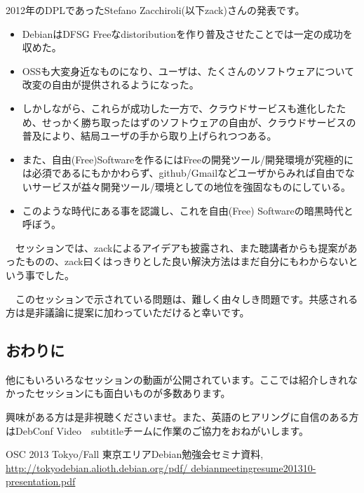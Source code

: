\documentclass[mingoth,a4paper]{jsarticle}
\begin{document}
 2012年のDPLであったStefano Zacchiroli(以下zack)さんの発表です。

 \begin{itemize}
  \item DebianはDFSG Freeなdistoributionを作り普及させたことでは一定の成功を収めた。
　\item OSSも大変身近なものになり、ユーザは、たくさんのソフトウェアについて改変の自由が提供されるようになった。
  \item しかしながら、これらが成功した一方で、クラウドサービスも進化したため、せっかく勝ち取ったはずのソフトウェアの自由が、クラウドサービスの普及により、結局ユーザの手から取り上げられつつある。
 \item また、自由(Free)Softwareを作るにはFreeの開発ツール/開発環境が究極的には必須であるにもかかわらず、github/Gmailなどユーザからみれば自由でないサービスが益々開発ツール/環境としての地位を強固なものにしている。
 \end{itemize}

 \begin{itemize}
 \item このような時代にある事を認識し、これを自由(Free) Softwareの暗黒時代と呼ぼう。
\end{itemize}

　セッションでは、zackによるアイデアも披露され、また聴講者からも提案があったものの、zack曰くはっきりとした良い解決方法はまだ自分にもわからないという事でした。

　このセッションで示されている問題は、難しく由々しき問題です。共感される方は是非議論に提案に加わっていただけると幸いです。

\subsection{おわりに}

 他にもいろいろなセッションの動画が公開されています。ここでは紹介しきれなかったセッションにも面白いものが多数あります。

 興味がある方は是非視聴くださいませ。また、英語のヒアリングに自信のある方はDebConf Video　subtitleチームに作業のご協力をおねがいします。

\begin{thebibliography}{9}
OSC 2013 Tokyo/Fall 東京エリアDebian勉強会セミナ資料, \url{http://tokyodebian.alioth.debian.org/pdf/ debianmeetingresume201310-presentation.pdf}
\end{thebibliography}

\end{document}
